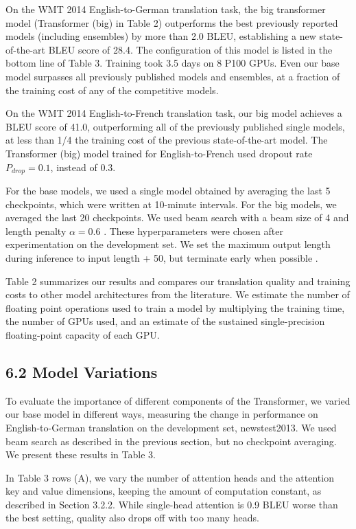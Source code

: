 \documentclass[conference]{IEEEtran}
\begin{document}
On the WMT 2014 English-to-German translation task, the big transformer model (Transformer (big) in Table 2) outperforms the best previously reported models (including ensembles) by more than 2.0 BLEU, establishing a new state-of-the-art BLEU score of 28.4. The configuration of this model is listed in the bottom line of Table 3. Training took 3.5 days on 8 P100 GPUs. Even our base model surpasses all previously published models and ensembles, at a fraction of the training cost of any of the competitive models.

On the WMT 2014 English-to-French translation task, our big model achieves a BLEU score of 41.0, outperforming all of the previously published single models, at less than 1/4 the training cost of the previous state-of-the-art model. The Transformer (big) model trained for English-to-French used dropout rate $P_{drop} = 0.1$, instead of 0.3.

For the base models, we used a single model obtained by averaging the last 5 checkpoints, which were written at 10-minute intervals. For the big models, we averaged the last 20 checkpoints. We used beam search with a beam size of 4 and length penalty $\alpha = 0.6$ \cite{ref38}. These hyperparameters were chosen after experimentation on the development set. We set the maximum output length during inference to input length + 50, but terminate early when possible \cite{ref38}.

Table 2 summarizes our results and compares our translation quality and training costs to other model architectures from the literature. We estimate the number of floating point operations used to train a model by multiplying the training time, the number of GPUs used, and an estimate of the sustained single-precision floating-point capacity of each GPU.

\subsection{6.2 Model Variations}

To evaluate the importance of different components of the Transformer, we varied our base model in different ways, measuring the change in performance on English-to-German translation on the development set, newstest2013. We used beam search as described in the previous section, but no checkpoint averaging. We present these results in Table 3.

In Table 3 rows (A), we vary the number of attention heads and the attention key and value dimensions, keeping the amount of computation constant, as described in Section 3.2.2. While single-head attention is 0.9 BLEU worse than the best setting, quality also drops off with too many heads.
\end{document}
